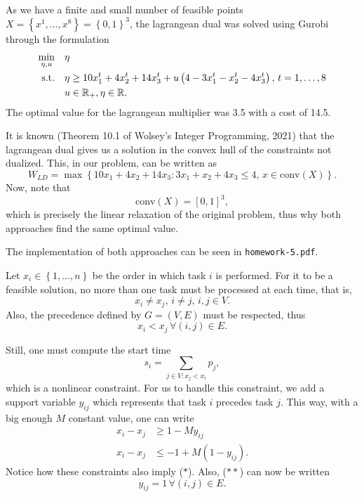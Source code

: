 \documentclass[a4paper]{report}
\begin{document}
As we have a finite and small number of feasible points $X=\left\{ x^{1},\ldots,x^{8} \right\} = \left\{ 0,1 \right\}^{3}$, the lagrangean dual was solved using Gurobi through the formulation
\begin{align*}
    \min_{\eta,u} \quad & \eta \\
    \textrm{s.t.} \quad & \eta \ge 10x_1^{t}+4x_2^{t}+14x_3^{t} + u\left( 4-3x_1^{t}-x_2^{t}-4x_3^{t} \right),\, t=1,\ldots,8  \\
      & u\in \mathbb{R}_+,\eta\in \mathbb{R}
.\end{align*}
The optimal value for the lagrangean multiplier was 3.5 with a cost of 14.5.

It is known (Theorem 10.1 of Wolsey's Integer Programming, 2021) that the lagrangean dual gives us a solution in the convex hull of the constraints not dualized. This, in our problem, can be written as \[
W_{LD} = \max\left\{ 10x_1+4x_2+14x_3 : 3x_1+x_2+4x_3\le 4,\, x\in \text{conv}\left( X \right)  \right\} 
.\] Now, note that \[
\text{conv}\left( X \right) = \left[ 0,1 \right] ^{3}
,\] which is precisely the linear relaxation of the original problem, thus why both approaches find the same optimal value.

The implementation of both approaches can be seen in \texttt{homework-5.pdf}.



Let $x_i \in \left\{ 1,\ldots,n \right\} $ be the order in which task $i$ is performed. For it to be a feasible solution, no more than one task must be processed at each time, that is, \[
x_i \neq x_j ,\, i\neq j,\, i,j \in V \tag{$*$}
.\] Also, the precedence defined by $G=\left( V,E \right) $ must be respected, thus \[
x_i < x_j\,\forall \left( i,j \right) \in E \tag{$**$}
.\]

Still, one must compute the start time \[
s_i = \sum_{j \in V : x_j < x_i } p_j
,\] which is a nonlinear constraint. For us to handle this constraint, we add a support variable $y_{ij}$ which represents that task $i$ precedes task $j$. This way, with a big enough $M$ constant value, one can write
\begin{align*}
    x_i - x_j &\ge 1 - My_{ij} \\
    x_i - x_j &\le -1 + M \left( 1 -  y_{ij}\right)
.\end{align*}
Notice how these constraints also imply ($*$). Also, ($**$) can now be written \[
y_{ij} = 1\,\forall \left( i,j \right) \in E 
.\] 
\end{document}
